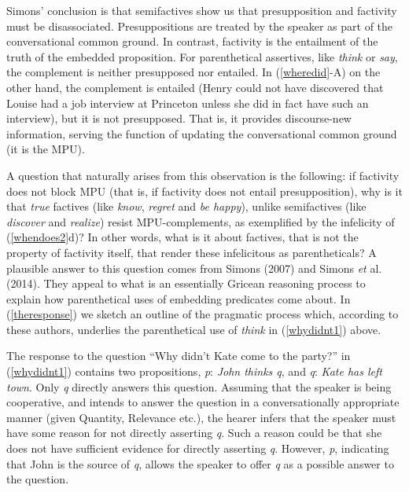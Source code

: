 \documentclass[output=paper]{LSP/langsci}
\begin{document}
Simons' conclusion %
is that semifactives show us that presupposition and factivity must be disassociated. Presuppositions are treated by the speaker as part of the conversational common ground. In contrast, factivity is the entailment of the truth of the embedded proposition. For parenthetical assertives, like \textit{think} or \textit{say}, the complement is neither presupposed nor entailed.  In (\ref{wheredid}-A) on the other hand, the complement is entailed (Henry could not have discovered that Louise had a job interview at Princeton unless she did in fact have such an interview), but it is not presupposed. That is, it provides discourse-new information, serving the function of updating the conversational common ground (it is the MPU).

A question that naturally arises from this observation is the following: if factivity does not block MPU (that is, if factivity does not entail presupposition), why is it that \textit{true} factives (like \textit{know}, \textit{regret} and \textit{be happy}), unlike semifactives (like \textit{discover} and \textit{realize}) resist MPU-complements, as exemplified by the infelicity of (\ref{whendoes2}d)? In other words, what is it about factives, that is not the property of factivity itself, that render these infelicitous as parentheticals? A plausible answer to this question comes from Simons (2007) and Simons \textit{et} al. (2014). They appeal to what is an essentially Gricean reasoning process to explain how parenthetical uses of embedding predicates come about. In (\ref{theresponse}) we sketch an outline of the pragmatic process which, according to these authors, underlies the parenthetical use of \textit{think} in (\ref{whydidnt1}) above.

\begin{exe}
	\ex \label{theresponse}
	\begin{xlist}
		\ex The response to the question ``Why didn't Kate come to the party?'' in (\ref{whydidnt1}) contains two propositions, \textit{p}: \emph{John thinks \textit{q}}, and \textit{q}: \emph{Kate has left town}. Only \textit{q} directly answers this question.
		\ex Assuming that the speaker is being cooperative, and intends to answer the question in a conversationally appropriate manner (given Quantity, Relevance etc.), the hearer infers that the speaker must have some reason for not directly asserting \textit{q}. Such a reason could be that she does not have sufficient evidence for directly asserting \textit{q}. However, \textit{p}, indicating that John is the source of \textit{q}, allows the speaker to offer \textit{q} as a possible answer to the question.
	\end{xlist}
\end{exe}
\end{document}

